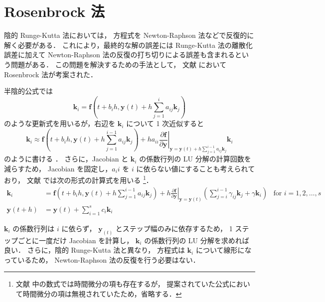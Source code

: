 \section{Rosenbrock 法}\label{sec:ode_rosenbrock}

陰的 Runge-Kutta 法においては，
方程式を Newton-Raphson 法などで反復的に解く必要がある．
これにより，最終的な解の誤差には Runge-Kutta 法の離散化誤差に加えて
Newton-Raphson 法の反復の打ち切りによる誤差も含まれるという問題がある．
この問題を解決するための手法として，
文献 \cite{Rosenbrock1963} において Rosenbrock 法が考案された．

半陰的公式では
\begin{equation}
    \bm{k}_i = \bm{f}\left(t + b_i h, \bm{y}(t) + h \sum_{j = 1}^i a_{ij} \bm{k}_j \right)
\end{equation}
のような更新式を用いるが，右辺を $\bm{k}_i$ について 1 次近似すると
\begin{equation}
    \bm{k}_i \approx \bm{f}\left(t + b_i h, \bm{y}(t) + h \sum_{j = 1}^{i-1} a_{ij} \bm{k}_j \right)
    + h a_{ii}
    \left. \frac{\partial \bm{f}}{\partial \bm{y}}
    \right|_{\bm{y} = \bm{y}(t) + h \sum_{j = 1}^{i-1} a_{ij} \bm{k}_j}
    \bm{k}_i
\end{equation}
のように書ける \cite{Rosenbrock1963}．
さらに，Jacobian と $\bm{k}_i$ の係数行列の LU 分解の計算回数を減らすため，
Jacobian を固定し，$a_ii$ を $i$ に依らない値にすることも考えられており，
文献 \cite{Rang2005} では次の形式の計算式を用いる
\footnote{文献 \cite{Rang2005} 中の数式では時間微分の項も存在するが，%
    提案されていた公式において時間微分の項は無視されていたため，省略する．}．
\begin{align}
    \bm{k}_i
     & = \bm{f}\left(t + b_i h, \bm{y}(t) + h \sum_{j = 1}^{i - 1} a_{ij} \bm{k}_j \right)
    + h
    \left. \frac{\partial \bm{f}}{\partial \bm{y}} \right|_{\bm{y} = \bm{y}(t)}
    \left( \sum_{j = i}^{i - 1} \gamma_{ij} \bm{k}_j + \gamma \bm{k}_i \right)
     & \text{for $i = 1, 2, \ldots, s$}
    \label{eq:ode_rosenbrock_k-law}                                                        \\
    \bm{y}(t + h)
     & = \bm{y}(t) + \sum_{i=1}^{s} c_i \bm{k}_i
    \label{eq:ode_rosenbrock_y-law}
\end{align}

$\bm{k}_i$ の係数行列は $i$ に依らず，
$\bm{y}_(t)$ とステップ幅のみに依存するため，
1 ステップごとに一度だけ Jacobian を計算し，
$\bm{k}_i$ の係数行列の LU 分解を求めれば良い．
さらに，陰的 Runge-Kutta 法と異なり，
方程式は $\bm{k}_i$ について線形になっているため，
Newton-Raphson 法の反復を行う必要はない．


